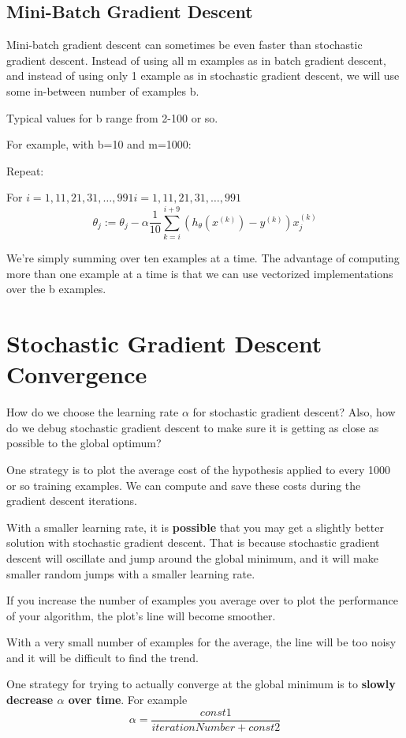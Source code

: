 \subsection{Mini-Batch Gradient Descent}
Mini-batch gradient descent can sometimes be even faster than stochastic gradient descent. Instead of using all m examples as in batch gradient descent, and instead of using only 1 example as in stochastic gradient descent, we will use some in-between number of examples b.

Typical values for b range from 2-100 or so.

For example, with b=10 and m=1000:

Repeat:

For $i = 1,11,21,31,\dots,991i=1,11,21,31,…,991$
$$
\theta_j := \theta_j - \alpha \dfrac{1}{10} \displaystyle \sum_{k=i}^{i+9} (h_\theta(x^{(k)}) - y^{(k)})x_j^{(k)}$$

We're simply summing over ten examples at a time. The advantage of computing more than one example at a time is that we can use vectorized implementations over the b examples.

\section{Stochastic Gradient Descent Convergence}
How do we choose the learning rate $\alpha$ for stochastic gradient descent? Also, how do we debug stochastic gradient descent to make sure it is getting as close as possible to the global optimum?

One strategy is to plot the average cost of the hypothesis applied to every 1000 or so training examples. We can compute and save these costs during the gradient descent iterations.

With a smaller learning rate, it is \textbf{possible} that you may get a slightly better solution with stochastic gradient descent. That is because stochastic gradient descent will oscillate and jump around the global minimum, and it will make smaller random jumps with a smaller learning rate.

If you increase the number of examples you average over to plot the performance of your algorithm, the plot's line will become smoother.

With a very small number of examples for the average, the line will be too noisy and it will be difficult to find the trend.

One strategy for trying to actually converge at the global minimum is to \textbf{slowly decrease $\alpha$ over time}. For example $$\alpha = \dfrac{const1}{iterationNumber + const2}$$

